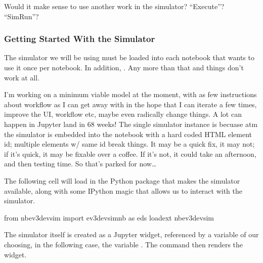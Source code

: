 \documentclass[letterpaper,10pt,english]{sphinxmanual}
\let\sphinxpxdimen\pdfpxdimen\else\newdimen\sphinxpxdimen
\begin{document}
\sphinxincludegraphics[width=661\sphinxpxdimen,height=441\sphinxpxdimen]{{ev3-jupyter-arch}.png}



Would it make sense to use another work in the simulator? “Execute”? “SimRun”?




\subsubsection{Getting Started With the Simulator}
\label{\detokenize{content/01_Robot_Lab/Section_00_01:Getting-Started-With-the-Simulator}}
The simulator we will be using must be loaded into each notebook that wants to use it once per notebook. In addition, . Any more than that and things don’t work at all.



I’m working on a minimum viable model at the moment, with as few instructions about workflow as I can get away with in the hope that I can iterate a few times, improve the UI, workflow etc, maybe even radically change things. A lot can happen in Jupyter land in 6\sphinxhyphen{}8 weeks! The single simulator instance is becuase atm the simulator is embedded into the notebook with a hard coded HTML element id; multiple elements w/ same id break things. It may be a quick fix, it may not; if it’s quick, it may be
fixable over a coffee. If it’s not, it could take an afternoon, and then testing time. So that’s parked for now…



The following cell will load in the Python package that makes the simulator available, along with some IPython magic that allows us to interact with the simulator.

{
\begin{sphinxVerbatim}[commandchars=\\\{\}]
\llap{\color{nbsphinxin}[ ]:\,\hspace{\fboxrule}\hspace{\fboxsep}}from nbev3devsim import ev3devsim\PYGZus{}nb as eds
\PYGZpc{}load\PYGZus{}ext nbev3devsim
\end{sphinxVerbatim}
}

The simulator itself is created as a Jupyter widget, referenced by a variable of our choosing, in the following case, the variable . The  command then renders the widget.
\end{document}
